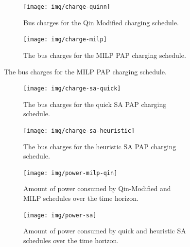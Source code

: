 \documentclass[energies,article,submit,moreauthors]{Definitions/mdpi}
\begin{document}
\begin{figure}
  \begin{subfigure}[t]{\textwidth}
    \centering
    \texttt{[image: img/charge-quinn]}
    \caption{Bus charges for the Qin Modified charging schedule.}
    \label{subfig:qin-charge}
  \end{subfigure}
  \hfill
  \begin{subfigure}[t]{\textwidth}
    \centering
    \texttt{[image: img/charge-milp]}
    \caption{The bus charges for the MILP PAP charging schedule.}
    \label{subfig:milp-charge}
  \end{subfigure}
  \hfill
\end{figure}

\begin{figure}\ContinuedFloat
  \begin{subfigure}[t]{\textwidth}
    \centering
    \texttt{[image: img/charge-sa-quick]}
    \caption{The bus charges for the quick SA PAP charging schedule.}
    \label{subfig:sa-quick-charge}
  \end{subfigure}
  \hfill
  \begin{subfigure}[t]{\textwidth}
    \centering
    \texttt{[image: img/charge-sa-heuristic]}
    \caption{The bus charges for the heuristic SA PAP charging schedule.}
    \label{subfig:sa-heuristic-charge}
  \end{subfigure}
  \caption{}
  \label{fig:charge}
\end{figure}

\begin{figure}
  \begin{subfigure}[t]{\textwidth}
    \centering
    \texttt{[image: img/power-milp-qin]}
    \caption{Amount of power consumed by Qin-Modified and MILP schedules over the time horizon.}
    \label{fig:power-usage-milp-qin}
  \end{subfigure}

  \hfill

  \begin{subfigure}[t]{\textwidth}
    \centering
    \texttt{[image: img/power-sa]}
    \caption{Amount of power consumed by quick and heuristic SA schedules over the time horizon.}
    \label{fig:power-usage-sa}
  \end{subfigure}
  \caption{}
  \label{fig:power}
\end{figure}
\end{document}
